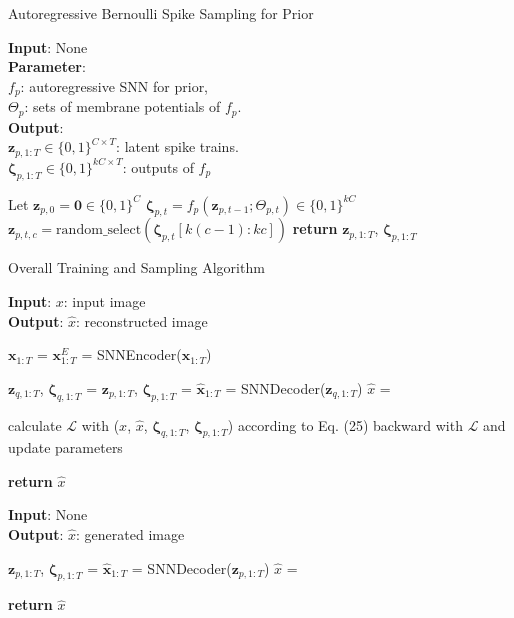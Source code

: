 \documentclass[letterpaper]{article} %
\begin{document}
\begin{algorithm}[htb]
\caption{Autoregressive Bernoulli Spike Sampling for Prior}
\label{alg:algorithm2}
\textbf{Input}: None\\
\textbf{Parameter}:\\
\qquad $f_p$: autoregressive SNN for prior,\\
\qquad $\Theta_p$: sets of membrane potentials of $f_p$. \\
\textbf{Output}:\\
$\bm{z}_{p,1:T}\in \{0,1\}^{C\times T}$: latent spike trains.\\
$\bm{\zeta}_{p,1:T}\in \{0,1\}^{kC\times T}$: outputs of $f_p$\\
\begin{algorithmic}[1] %
\State Let $\bm{z}_{p,0}=\bm{0} \in \{0,1\}^C$
\State $\bm{\zeta}_{p,t} = f_p (\bm{z}_{p,t-1}; \Theta_{p,t}) \in \{0,1\}^{kC}$
\State $\bm{z}_{p,t,c} = \mathrm{random\_select}(\bm{\zeta}_{p,t}[k(c-1):kc])$
\EndFor
\EndFor
\State \textbf{return} $\bm{z}_{p,1:T}$, $\bm{\zeta}_{p,1:T}$
\EndFunction
\end{algorithmic}
\end{algorithm}

\begin{algorithm}[t!]
\caption{Overall Training and Sampling Algorithm}
\label{alg:algorithm3}
\textbf{Input}: $x$: input image\\
\textbf{Output}: $\hat{x}$: reconstructed image
\begin{algorithmic}[1] %
\State $\bm{x}_{1:T}$ = 
\State $\bm{x}_{1:T}^E$ = SNNEncoder($\bm{x}_{1:T}$)

\State $\bm{z}_{q,1:T}$, $\bm{\zeta}_{q,1:T}$ = 
\State $\bm{z}_{p,1:T}$, $\bm{\zeta}_{p,1:T}$ = 
\State $\hat{\bm{x}}_{1:T}$ = SNNDecoder($\bm{z}_{q,1:T}$)
\State $\hat{x}$ = 

\State calculate $\mathcal{L}$ with ($x$, $\hat{x}$, $\bm{\zeta}_{q,1:T}$, $\bm{\zeta}_{p,1:T}$) according to Eq. (25)
\State backward with $\mathcal{L}$ and update parameters

\State \textbf{return} $\hat{x}$
\EndFunction
\end{algorithmic}

\textbf{Input}: None\\
\textbf{Output}: $\hat{x}$: generated image
\begin{algorithmic}[1] %
\State $\bm{z}_{p,1:T}$, $\bm{\zeta}_{p,1:T}$ = 
\State $\hat{\bm{x}}_{1:T}$ = SNNDecoder($\bm{z}_{p,1:T}$)
\State $\hat{x}$ = 

\State \textbf{return} $\hat{x}$
\EndFunction
\end{algorithmic}
\end{algorithm}
\end{document}
